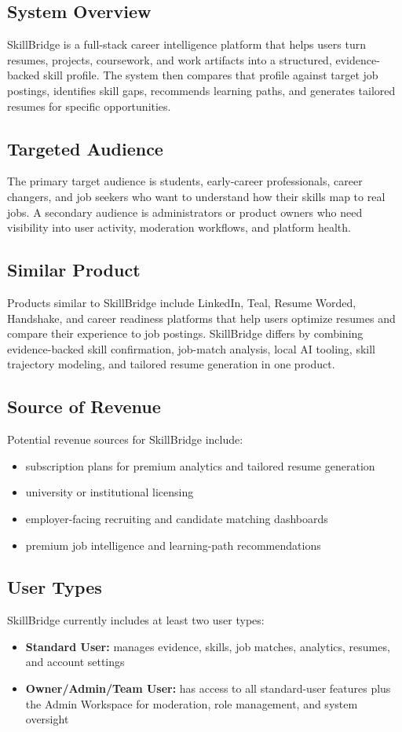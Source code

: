 \documentclass[11pt]{article}
\begin{document}
\subsection{System Overview}
SkillBridge is a full-stack career intelligence platform that helps users turn resumes, projects, coursework, and work artifacts into a structured, evidence-backed skill profile. The system then compares that profile against target job postings, identifies skill gaps, recommends learning paths, and generates tailored resumes for specific opportunities.

\subsection{Targeted Audience}
The primary target audience is students, early-career professionals, career changers, and job seekers who want to understand how their skills map to real jobs. A secondary audience is administrators or product owners who need visibility into user activity, moderation workflows, and platform health.

\subsection{Similar Product}
Products similar to SkillBridge include LinkedIn, Teal, Resume Worded, Handshake, and career readiness platforms that help users optimize resumes and compare their experience to job postings. SkillBridge differs by combining evidence-backed skill confirmation, job-match analysis, local AI tooling, skill trajectory modeling, and tailored resume generation in one product.

\subsection{Source of Revenue}
Potential revenue sources for SkillBridge include:
\begin{itemize}[leftmargin=1.25em]
  \item subscription plans for premium analytics and tailored resume generation
  \item university or institutional licensing
  \item employer-facing recruiting and candidate matching dashboards
  \item premium job intelligence and learning-path recommendations
\end{itemize}

\subsection{User Types}
SkillBridge currently includes at least two user types:
\begin{itemize}[leftmargin=1.25em]
  \item \textbf{Standard User:} manages evidence, skills, job matches, analytics, resumes, and account settings
  \item \textbf{Owner/Admin/Team User:} has access to all standard-user features plus the Admin Workspace for moderation, role management, and system oversight
\end{itemize}
\end{document}
